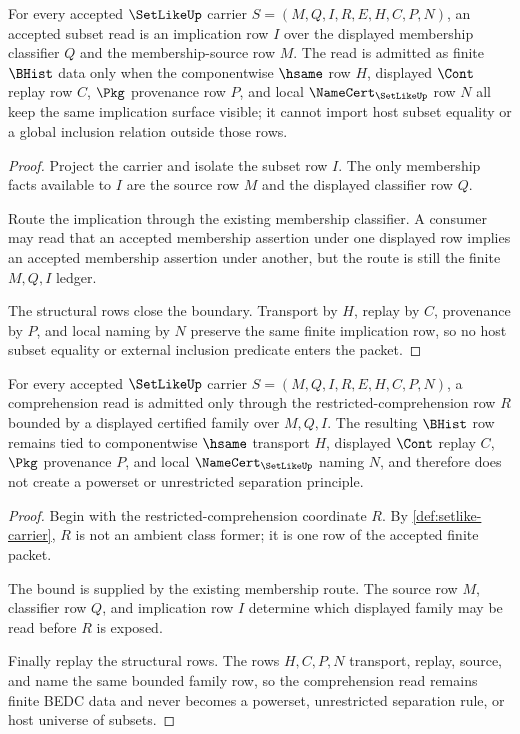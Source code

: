 \begin{theorem}
\label{thm:setlike-subset-implication-obligation}
For every accepted $\SetLikeUp$ carrier $S=(M,Q,I,R,E,H,C,P,N)$, an accepted subset read is an implication row $I$ over the displayed membership classifier $Q$ and the membership-source row $M$. The read is admitted as finite $\BHist$ data only when the componentwise $\hsame$ row $H$, displayed $\Cont$ replay row $C$, $\Pkg$ provenance row $P$, and local $\NameCert_{\SetLikeUp}$ row $N$ all keep the same implication surface visible; it cannot import host subset equality or a global inclusion relation outside those rows.
\end{theorem}
\begin{proof}
Project the carrier and isolate the subset row $I$. The only membership facts available to $I$ are the source row $M$ and the displayed classifier row $Q$.

Route the implication through the existing membership classifier. A consumer may read that an accepted membership assertion under one displayed row implies an accepted membership assertion under another, but the route is still the finite $M,Q,I$ ledger.

The structural rows close the boundary. Transport by $H$, replay by $C$, provenance by $P$, and local naming by $N$ preserve the same finite implication row, so no host subset equality or external inclusion predicate enters the packet.
\end{proof}

\begin{theorem}
\label{thm:setlike-bounded-comprehension-obligation}
For every accepted $\SetLikeUp$ carrier $S=(M,Q,I,R,E,H,C,P,N)$, a comprehension read is admitted only through the restricted-comprehension row $R$ bounded by a displayed certified family over $M,Q,I$. The resulting $\BHist$ row remains tied to componentwise $\hsame$ transport $H$, displayed $\Cont$ replay $C$, $\Pkg$ provenance $P$, and local $\NameCert_{\SetLikeUp}$ naming $N$, and therefore does not create a powerset or unrestricted separation principle.
\end{theorem}
\begin{proof}
Begin with the restricted-comprehension coordinate $R$. By \autoref{def:setlike-carrier}, $R$ is not an ambient class former; it is one row of the accepted finite packet.

The bound is supplied by the existing membership route. The source row $M$, classifier row $Q$, and implication row $I$ determine which displayed family may be read before $R$ is exposed.

Finally replay the structural rows. The rows $H,C,P,N$ transport, replay, source, and name the same bounded family row, so the comprehension read remains finite BEDC data and never becomes a powerset, unrestricted separation rule, or host universe of subsets.
\end{proof}

